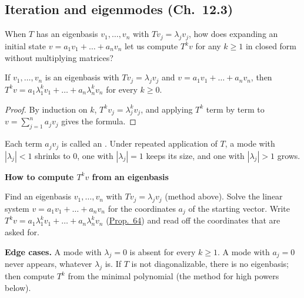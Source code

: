 \documentclass[10pt]{scrartcl}
\newenvironment{methodbox}[1]{\begin{mdframed}[style=mdbluebox,linecolor=NavyBlue,backgroundcolor=NavyBlue!3]\textbf{\color{NavyBlue}#1}\par\vspace{2pt}}{\end{mdframed}}
\begin{document}
\begin{fig}
\end{fig}

\subsection{Iteration and eigenmodes (Ch.~12.3)}

\begin{qbox}
  When $T$ has an eigenbasis $v_1,\dots,v_n$ with $Tv_j=\lambda_jv_j$, how does expanding an initial state $v=a_1v_1+\dots+a_nv_n$ let us compute $T^kv$ for any $k\ge 1$ in closed form without multiplying matrices?
\end{qbox}

\begin{proposition*}\hypertarget{prop-64}{}\label{prop-64}
  If $v_1,\dots,v_n$ is an eigenbasis with $Tv_j=\lambda_jv_j$ and $v=a_1v_1+\dots+a_nv_n$, then $T^kv=a_1\lambda_1^kv_1+\dots+a_n\lambda_n^kv_n$ for every $k\ge0$.
\end{proposition*}
\begin{proof}
  By induction on $k$, $T^k v_j = \lambda_j^k v_j$, and applying $T^k$ term by term to $v = \sum_{j=1}^n a_j v_j$ gives the formula.
\end{proof}
Each term $a_jv_j$ is called an . Under repeated application of $T$, a mode with $|\lambda_j|<1$ shrinks to $0$, one with $|\lambda_j|=1$ keeps its size, and one with $|\lambda_j|>1$ grows.

\begin{methodbox}{How to compute $T^kv$ from an eigenbasis}
\begin{enumerate}[label=\arabic*.,leftmargin=1.5em,itemsep=2pt,topsep=2pt]
  \ii Find an eigenbasis $v_1,\dots,v_n$ with $Tv_j=\lambda_jv_j$ (method above).
  \ii Solve the linear system $v=a_1v_1+\dots+a_nv_n$ for the coordinates $a_j$ of the starting vector.
  \ii Write $T^kv=a_1\lambda_1^kv_1+\dots+a_n\lambda_n^kv_n$ (\hyperref[prop-64]{Prop.~64}) and read off the coordinates that are asked for.
\end{enumerate}
\textbf{Edge cases.} A mode with $\lambda_j=0$ is absent for every $k\ge1$. A mode with $a_j=0$ never appears, whatever $\lambda_j$ is. If $T$ is not diagonalizable, there is no eigenbasis; then compute $T^k$ from the minimal polynomial (the method for high powers below).
\end{methodbox}
\end{document}
